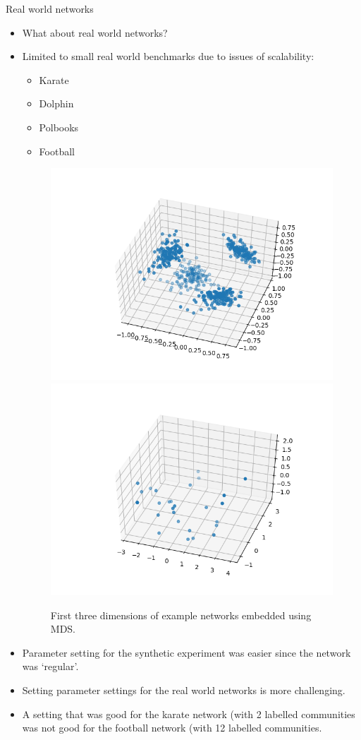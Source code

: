 \documentclass{beamer}
\begin{document}
	\begin{frame}[allowframebreaks]{Real world networks}
	\begin{itemize}
	\item What about real world networks?
	\item Limited to small real world benchmarks due to issues of scalability:
	\begin{itemize}
	\item Karate
	\item Dolphin
	\item Polbooks
	\item Football
	\end{itemize}
	\begin{figure}
	\centering
	\includegraphics[scale=0.25]{3dprojection.png}
	\includegraphics[scale=0.25]{3dkarate.png}
	\caption{First three dimensions of example networks embedded using MDS.}
	\end{figure}
		\item Parameter setting for the synthetic experiment was easier since the network was `regular'.
	\item Setting parameter settings for the real world networks is more challenging.
	\item A setting that was good for the karate network (with 2 labelled communities was not good for the football network (with 12 labelled communities.
	\end{itemize}
	

\end{frame}
\end{document}
